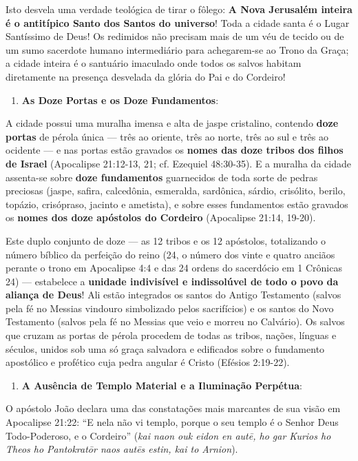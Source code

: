 Isto desvela uma verdade teológica de tirar o fôlego: \textbf{A Nova Jerusalém inteira é o antitípico Santo dos Santos do universo}!
Toda a cidade santa é o Lugar Santíssimo de Deus! Os redimidos não precisam mais de um véu de tecido ou de um sumo sacerdote humano intermediário para achegarem-se ao Trono da Graça; a cidade inteira é o santuário imaculado onde todos os salvos habitam diretamente na presença desvelada da glória do Pai e do Cordeiro!

\begin{enumerate}
  \item \textbf{As Doze Portas e os Doze Fundamentos}:
\end{enumerate}

A cidade possui uma muralha imensa e alta de jaspe cristalino, contendo \textbf{doze portas} de pérola única — três ao oriente, três ao norte, três ao sul e três ao ocidente — e nas portas estão gravados os \textbf{nomes das doze tribos dos filhos de Israel} (Apocalipse 21:12-13, 21; cf. Ezequiel 48:30-35).
E a muralha da cidade assenta-se sobre \textbf{doze fundamentos} guarnecidos de toda sorte de pedras preciosas (jaspe, safira, calcedônia, esmeralda, sardônica, sárdio, crisólito, berilo, topázio, crisópraso, jacinto e ametista), e sobre esses fundamentos estão gravados os \textbf{nomes dos doze apóstolos do Cordeiro} (Apocalipse 21:14, 19-20).

Este duplo conjunto de doze — as 12 tribos e os 12 apóstolos, totalizando o número bíblico da perfeição do reino (24, o número dos vinte e quatro anciãos perante o trono em Apocalipse 4:4 e das 24 ordens do sacerdócio em 1 Crônicas 24) — estabelece a \textbf{unidade indivisível e indissolúvel de todo o povo da aliança de Deus}!
Ali estão integrados os santos do Antigo Testamento (salvos pela fé no Messias vindouro simbolizado pelos sacrifícios) e os santos do Novo Testamento (salvos pela fé no Messias que veio e morreu no Calvário). Os salvos que cruzam as portas de pérola procedem de todas as tribos, nações, línguas e séculos, unidos sob uma só graça salvadora e edificados sobre o fundamento apostólico e profético cuja pedra angular é Cristo (Efésios 2:19-22).

\begin{enumerate}
  \item \textbf{A Ausência de Templo Material e a Iluminação Perpétua}:
\end{enumerate}

O apóstolo João declara uma das constatações mais marcantes de sua visão em Apocalipse 21:22:
``E nela não vi templo, porque o seu templo é o Senhor Deus Todo-Poderoso, e o Cordeiro'' (\textit{kai naon ouk eidon en autē, ho gar Kurios ho Theos ho Pantokratōr naos autēs estin, kai to Arnion}).

